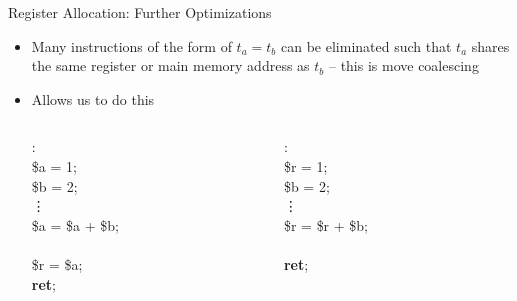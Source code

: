 \documentclass[aspectratio=169]{beamer}
\begin{document}
\begin{frame}{Register Allocation: Further Optimizations}
    \begin{itemize}
        \item Many instructions of the form of $t_a = t_b$ can be eliminated such that $t_a$ shares the same register or main memory address as $t_b$ -- this is move coalescing
        \pause
        \item Allows us to do this
        \begin{columns}
            \begin{column}{2cm}
                \begin{algo}
                    :\+
                    \\ \$a = 1;
                    \\ \$b = 2;
                    \\ \vdots
                    \\ \textcolor{sigma@alertred}{\$a} = \textcolor{sigma@alertred}{\$a} + \$b;
                    \\
                    \\ \$r = \textcolor{sigma@alertred}{\$a};
                    \\ \textbf{ret};
                \end{algo}
            \end{column}
            \begin{column}{2cm}
                \begin{algo}
                    :\+
                    \\ \textcolor{sigma@alertred}{\$r} = 1;
                    \\ \$b = 2;
                    \\ \vdots
                    \\ \textcolor{sigma@alertred}{\$r} = \textcolor{sigma@alertred}{\$r} + \$b;
                    \\
                    \\ \textbf{ret};
                \end{algo}
            \end{column}
        \end{columns}
    \end{itemize}
\end{frame}
\end{document}
